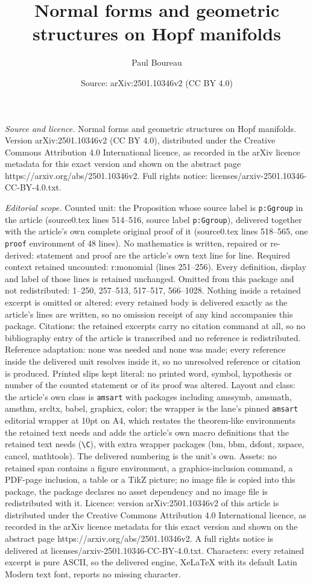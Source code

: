 \documentclass[10pt,a4paper]{amsart}
\title[Normal forms and geometric structures on Hopf manifolds]{Normal forms and geometric structures on Hopf manifolds}
\author{Paul Boureau}
\date{Source: arXiv:2501.10346v2 (CC BY 4.0)}
\begin{document}
\maketitle

\noindent\emph{Source and licence.} Normal forms and geometric structures on Hopf manifolds. Version arXiv:2501.10346v2 (CC BY 4.0), distributed under the Creative Commons Attribution 4.0 International licence, as recorded in the arXiv licence metadata for this exact version and shown on the abstract page https://arxiv.org/abs/2501.10346v2. Full rights notice: licenses/arxiv-2501.10346-CC-BY-4.0.txt.\par\smallskip

\noindent\textit{Editorial scope.} Counted unit: the Proposition whose source label is \texttt{p:Ggroup} in the article (source0.tex lines 514--516, source label \texttt{p:Ggroup}), delivered together with the article's own complete original proof of it (source0.tex lines 518--565, one \texttt{proof} environment of 48 lines). No mathematics is written, repaired or re-derived: statement and proof are the article's own text line for line. Required context retained uncounted: r:monomial (lines 251--256). Every definition, display and label of those lines is retained unchanged. Omitted from this package and not redistributed: 1--250, 257--513, 517--517, 566--1028. Nothing inside a retained excerpt is omitted or altered: every retained body is delivered exactly as the article's lines are written, so no omission receipt of any kind accompanies this package. Citations: the retained excerpts carry no citation command at all, so no bibliography entry of the article is transcribed and no reference is redistributed. Reference adaptation: none was needed and none was made; every reference inside the delivered unit resolves inside it, so no unresolved reference or citation is produced. Printed slips kept literal: no printed word, symbol, hypothesis or number of the counted statement or of its proof was altered. Layout and class: the article's own class is \texttt{amsart} with packages including amssymb, amsmath, amsthm, srcltx, babel, graphicx, color; the wrapper is the lane's pinned \texttt{amsart} editorial wrapper at 10pt on A4, which restates the theorem-like environments the retained text needs and adds the article's own macro definitions that the retained text needs (\texttt{\textbackslash C}), with extra wrapper packages (bm, bbm, dsfont, xspace, cancel, mathtools). The delivered numbering is the unit's own. Assets: no retained span contains a figure environment, a graphics-inclusion command, a PDF-page inclusion, a table or a TikZ picture; no image file is copied into this package, the package declares no asset dependency and no image file is redistributed with it. Licence: version arXiv:2501.10346v2 of this article is distributed under the Creative Commons Attribution 4.0 International licence, as recorded in the arXiv licence metadata for this exact version and shown on the abstract page https://arxiv.org/abs/2501.10346v2. A full rights notice is delivered at licenses/arxiv-2501.10346-CC-BY-4.0.txt. Characters: every retained excerpt is pure ASCII, so the delivered engine, XeLaTeX with its default Latin Modern text font, reports no missing character.
\end{document}

